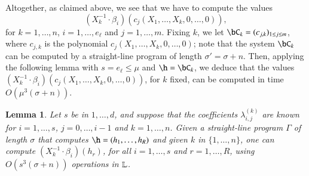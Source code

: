 \documentclass[amsthm]{elsart}
\newtheorem{lemma}[definition]{Lemma}
\begin{document}
Altogether, as claimed above, we see that we have to compute the
values
$$(X_k^{-1} \cdot \beta_i)(c_j(X_1,\dots,X_k,0,\dots,0)),$$ for
$k=1,\dots,n$, $i=1,\dots,e_\ell$ and $j=1,\dots,m$.  Fixing $k$, we
let $\bC_k = (c_{j,k})_{1 \le j \le m}$, where $c_{j,k}$ is the
polynomial $c_j(X_1,\dots,X_k,0,\dots,0)$; note that the system
$\bC_k$ can be computed by a straight-line program of length
$\sigma'= \sigma+n$. Then, applying the following lemma with
$s=e_\ell \le \mu$ and $\h = \bC_k$, we deduce that the values
$(X_k^{-1} \cdot \beta_i)(c_j(X_1,\dots,X_k,0,\dots,0))$, for $k$
fixed, can be computed in time $O(\mu^3 (\sigma+n))$.


\begin{lemma}
  Let $s$ be in $1,\dots,d$, and suppose that the coefficients
  $\lambda^{(k)}_{i,j}$ are known for $i=1,\dots,s$, $j=0,\dots,i-1$
  and $k=1,\dots,n$. Given a straight-line program $\Gamma$ of length
  $\sigma$ that computes $\h=(h_1,\dots,h_R)$ and given $k$ in
  $\{1,\dots,n\}$, one can compute $(X_k^{-1}\cdot \beta_i)(h_r)$, for
  all $i=1,\dots,s$ and $r=1,\dots,R$, using $O(s^3 (\sigma+n))$
  operations in $\mathbb{L}$.
\end{lemma}
\end{document}
